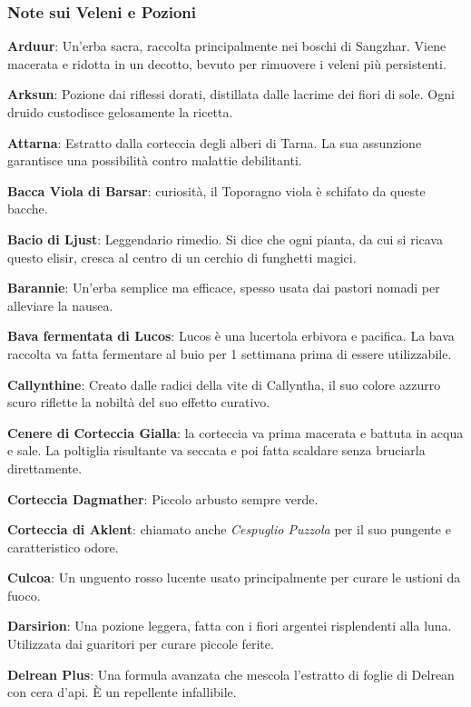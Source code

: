 \begin{multicols}{2}

\subsubsection{Note sui Veleni e Pozioni}


\textbf{Arduur}: Un'erba sacra, raccolta principalmente nei boschi di Sangzhar. Viene macerata e ridotta in un decotto, bevuto per rimuovere i veleni più persistenti.

\textbf{Arksun}: Pozione dai riflessi dorati, distillata dalle lacrime dei fiori di sole. Ogni druido custodisce gelosamente la ricetta.

\textbf{Attarna}: Estratto dalla corteccia degli alberi di Tarna. La sua assunzione garantisce una possibilità contro malattie debilitanti.

\textbf{Bacca Viola di Barsar}: curiosità, il Toporagno viola è schifato da queste bacche.

\textbf{Bacio di Ljust}: Leggendario rimedio. Si dice che ogni pianta, da cui si ricava questo elisir, cresca al centro di un cerchio di funghetti magici.

\textbf{Barannie}: Un'erba semplice ma efficace, spesso usata dai pastori nomadi per alleviare la nausea.

\textbf{Bava fermentata di Lucos}: Lucos è una lucertola erbivora e pacifica. La bava raccolta va fatta fermentare al buio per 1 settimana prima di essere utilizzabile.

\textbf{Callynthine}: Creato dalle radici della vite di Callyntha, il suo colore azzurro scuro riflette la nobiltà del suo effetto curativo.

\textbf{Cenere di Corteccia Gialla}: la corteccia va prima macerata e battuta in acqua e sale. La poltiglia risultante va seccata e poi fatta scaldare senza bruciarla direttamente.

\textbf{Corteccia Dagmather}: Piccolo arbusto sempre verde.

\textbf{Corteccia di Aklent}: chiamato anche \emph{Cespuglio Puzzola} per il suo pungente e caratteristico odore.

\textbf{Culcoa}: Un unguento rosso lucente usato principalmente per curare le ustioni da fuoco.

\textbf{Darsirion}: Una pozione leggera, fatta con i fiori argentei risplendenti alla luna. Utilizzata dai guaritori per curare piccole ferite.

\textbf{Delrean Plus}: Una formula avanzata che mescola l'estratto di foglie di Delrean con cera d'api. È un repellente infallibile.


\end{multicols}
